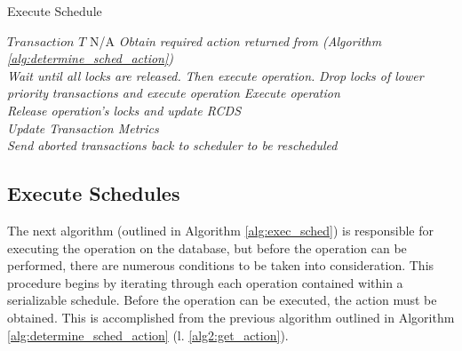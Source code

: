 \begin{algorithm}
\caption{Execute Schedule}
\label{alg:exec_sched}
\begin{algorithmic}[1]
\Require $Transaction$ $T$
\Ensure N/A
        \State \textit{Obtain required action returned}
        \State \textit{from (Algorithm \ref{alg:determine_sched_action})} \label{alg2:get_action}
        \\
         \label{alg2:decline_action}
            \State \textit{Wait until all locks are released.}
            \State \textit{Then execute operation.}
        \label{alg2:elev_action}
            \State \textit{Drop locks of lower priority }
            \State \textit{transactions and execute operation}
        \label{alg2:grant_action}
            \State \textit{Execute operation}
        \EndIf
        \\
        \State \textit{Release operation's locks and update RCDS}
    \EndFor
    \\
    \State \textit{Update Transaction Metrics}\label{alg2:update_metrics}
    \\
    \State \textit{Send aborted transactions back to}
    \State \textit{scheduler to be rescheduled}\label{alg2:abort}
\EndProcedure

\end{algorithmic}
\end{algorithm}

\subsection{Execute Schedules}

The next algorithm (outlined in Algorithm \ref{alg:exec_sched}) is responsible for executing the operation on the database, but before the operation can be performed, there are numerous conditions to be taken into consideration. This procedure begins by iterating through each operation contained within a serializable schedule. Before the operation can be executed, the action must be obtained. This is accomplished from the previous algorithm outlined in Algorithm \ref{alg:determine_sched_action} (l. \ref{alg2:get_action}).

